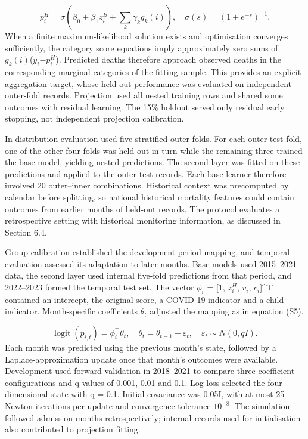 \documentclass[11pt,a4paper]{article}
\newcommand{\subheading}[1]{\par\needspace{3\baselineskip}\vspace{5pt}{\bfseries #1}\par\vspace{1pt}}
\begin{document}
\begin{equation}
p_i^H=\sigma\!\left(\beta_0+\beta_1z_i^B+\sum_k\gamma_kg_k(i)\right),\quad\sigma(s)=(1+e^{-s})^{-1}.
\end{equation}
When a finite maximum-likelihood solution exists and optimisation converges sufficiently, the category score equations imply approximately zero sums of $g_k(i)$($y_i$$-$$p_i^H$). Predicted deaths therefore approach observed deaths in the corresponding marginal categories of the fitting sample. This provides an explicit aggregation target, whose held-out performance was evaluated on independent outer-fold records. Projection used all nested training rows and shared some outcomes with residual learning. The 15\% holdout served only residual early stopping, not independent projection calibration.

In-distribution evaluation used five stratified outer folds. For each outer test fold, one of the other four folds was held out in turn while the remaining three trained the base model, yielding nested predictions. The second layer was fitted on these predictions and applied to the outer test records. Each base learner therefore involved 20 outer–inner combinations. Historical context was precomputed by calendar before splitting, so national historical mortality features could contain outcomes from earlier months of held-out records. The protocol evaluates a retrospective setting with historical monitoring information, as discussed in Section 6.4.

\subheading{S1.5 Monthly state updating}
Group calibration established the development-period mapping, and temporal evaluation assessed its adaptation to later months. Base models used 2015–2021 data, the second layer used internal five-fold predictions from that period, and 2022–2023 formed the temporal test set. The vector $\phi_i$ = [1, $z_i^H$, $v_i$, $c_i$]\textasciicircum{}T contained an intercept, the original score, a COVID-19 indicator and a child indicator. Month-specific coefficients $\theta_t$ adjusted the mapping as in equation (S5).

\begin{equation}
\operatorname{logit}(p_{i,t})=\phi_i^\top\theta_t,\quad\theta_t=\theta_{t-1}+\varepsilon_t,\quad\varepsilon_t\sim N(0,qI).
\end{equation}
Each month was predicted using the previous month’s state, followed by a Laplace-approximation update once that month’s outcomes were available. Development used forward validation in 2018–2021 to compare three coefficient configurations and q values of 0.001, 0.01 and 0.1. Log loss selected the four-dimensional state with q = 0.1. Initial covariance was 0.05I, with at most 25 Newton iterations per update and convergence tolerance $10^{-8}$. The simulation followed admission months retrospectively; internal records used for initialisation also contributed to projection fitting.
\end{document}
